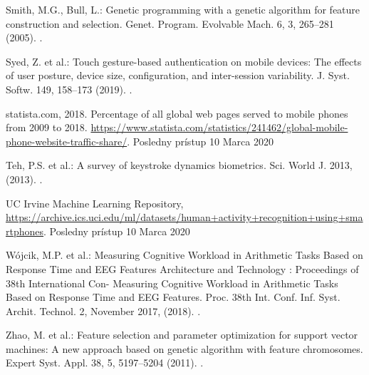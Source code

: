 \documentclass[runningheads]{llncs}
\begin{document}
\begin{thebibliography}{8}
Smith, M.G., Bull, L.: Genetic programming with a genetic algorithm for feature construction and selection. Genet. Program. Evolvable Mach. 6, 3, 265–281 (2005). .

Syed, Z. et al.: Touch gesture-based authentication on mobile devices: The effects of user posture, device size, configuration, and inter-session variability. J. Syst. Softw. 149, 158–173 (2019). .

statista.com, 2018. Percentage of all global web pages served to mobile phones from 2009 to 2018. \url{https://www.statista.com/statistics/241462/global-mobile-phone-website-traffic-share/}. Posledny prístup 10 Marca 2020

Teh, P.S. et al.: A survey of keystroke dynamics biometrics. Sci. World J. 2013, (2013). .

UC Irvine Machine Learning Repository, \url{https://archive.ics.uci.edu/ml/datasets/human+activity+recognition+using+smartphones}. Posledny prístup 10 Marca 2020

Wójcik, M.P. et al.: Measuring Cognitive Workload in Arithmetic Tasks Based on Response Time and EEG Features Architecture and Technology : Proceedings of 38th International Con- Measuring Cognitive Workload in Arithmetic Tasks Based on Response Time and EEG Features. Proc. 38th Int. Conf. Inf. Syst. Archit. Technol. 2, November 2017, (2018). .

Zhao, M. et al.: Feature selection and parameter optimization for support vector machines: A new approach based on genetic algorithm with feature chromosomes. Expert Syst. Appl. 38, 5, 5197–5204 (2011). .

\end{thebibliography}
\end{document}
